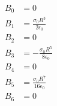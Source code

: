 \documentclass{article}
\begin{document}
\begin{align*}
  B_0          & = 0                                                                                                                                                                            \\
  B_1          & = \frac{\sigma_0 R^3}{2 \epsilon_0}                                                                                                                                            \\
  B_2          & = 0                                                                                                                                                                            \\
  B_3          & = -\frac{\sigma_0 R^5}{8 \epsilon_0}                                                                                                                                           \\
  B_4          & = 0                                                                                                                                                                            \\
  B_5          & = \frac{\sigma_0 R^7}{16 \epsilon_0}                                                                                                                                           \\
  B_6          & = 0
\end{align*}

\subsection{}
\end{document}
